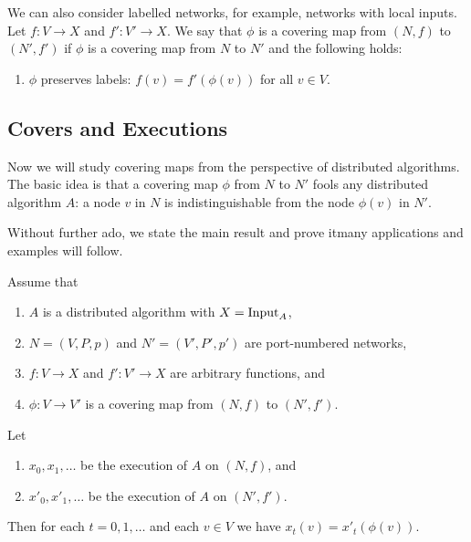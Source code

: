 We can also consider labelled networks, for example, networks with local inputs. Let $f\colon V \to X$ and $f'\colon V' \to X$. We say that $\phi$ is a covering map from $(N,f)$ to $(N'\!,f')$ if $\phi$ is a covering map from $N$ to $N'$ and the following holds:
\begin{enumerate}[resume*]
    \item $\phi$ preserves labels: $f(v) = f'(\phi(v))$ for all $v \in V$.
\end{enumerate}

\subsection{Covers and Executions}

Now we will study covering maps from the perspective of distributed algorithms. The basic idea is that a covering map $\phi$ from $N$ to $N'$ fools any distributed algorithm $A$: a node $v$ in $N$ is indistinguishable from the node $\phi(v)$ in $N'$.

Without further ado, we state the main result and prove it\mydash many applications and examples will follow.

\begin{theorem}\label{thm:cover}
    Assume that
    \begin{enumerate}[itemsep=0ex]\raggedright
        \item $A$ is a distributed algorithm with $X = \operatorname{Input}_A$,
        \item $N = (V,P,p)$ and $N' = (V'\!,P'\!,p')$ are port-numbered networks,
        \item $f\colon V \to X$ and $f'\colon V' \to X$ are arbitrary functions, and
        \item $\phi\colon V \to V'$ is a covering map from $(N,f)$ to $(N'\!,f')$.
    \end{enumerate}
    Let
    \begin{enumerate}[resume*]
        \item $x_0, x_1, \dotsc$ be the execution of $A$ on $(N,f)$, and
        \item $x'_0, x'_1, \dotsc$ be the execution of $A$ on $(N'\!,f')$.
    \end{enumerate}
    Then for each $t = 0, 1, \dotsc$ and each $v \in V$ we have $x_t(v) = x'_t(\phi(v))$.
\end{theorem}

